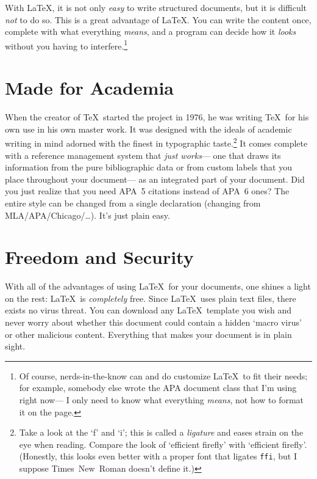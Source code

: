 \documentclass{psypaper}
\begin{document}
With \LaTeX, it is not only \emph{easy} to write structured documents,
  but it is difficult \emph{not} to do so.
This is a great advantage of \LaTeX.
You can write the content once,
  complete with what everything \emph{means},
  and a program can decide how it \emph{looks}
  without you having to interfere.\footnote{%
    Of course, nerds-in-the-know can and do customize \LaTeX\ to fit their needs;
    for example, somebody else wrote the APA document class that I'm using right now---%
    I only need to know what everything \emph{means},
    not how to format it on the page.}

\section{Made for Academia}
When the creator of \TeX\ started the project in 1976,
  he was writing \TeX\ for his own use in his own master work.
It was designed with the ideals of academic writing in mind
  adorned with the finest in typographic taste.\footnote{%
    Take a look at the `f' and `i';
    this is called a \textit{ligature} and eases strain on the eye when reading.
    Compare the look of `ef{}f{}icient f{}iref{}ly' with `efficient firefly'.
    (Honestly, this looks even better with a proper font that ligates \texttt{ffi},
    but I suppose Times~New~Roman doesn't define it.)}
It comes complete with a reference management system that \emph{just works}---%
  one that draws its information from the pure bibliographic data
  or from custom labels that you place throughout your document---%
  as an integrated part of your document.
Did you just realize that you need APA~5 citations instead of APA~6 ones?
The entire style can be changed from a single declaration
  (changing from MLA\slash APA\slash Chicago\slash\dots).
It's just plain easy.

\section{Freedom and Security}
With all of the advantages of using \LaTeX\ for your documents,
  one shines a light on the rest: %
  \LaTeX\ is \emph{completely} free.
Since \LaTeX\ uses plain text files,
  there exists no virus threat.
You can download any \LaTeX\ template you wish and
  never worry about whether this document
  could contain a hidden `macro virus'
  or other malicious content.
Everything that makes your document
  is in plain sight.
\end{document}
